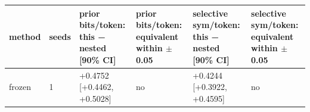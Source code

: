 \begin{tabular}{llllll}
\hline
method & seeds & prior bits/token: this − nested [90\% CI] & prior bits/token: equivalent within $\pm$0.05 & selective sym/token: this − nested [90\% CI] & selective sym/token: equivalent within $\pm$0.05 \\
\hline
frozen & 1 & +0.4752 [+0.4462, +0.5028] & no & +0.4244 [+0.3922, +0.4595] & no \\
\hline
\end{tabular}

